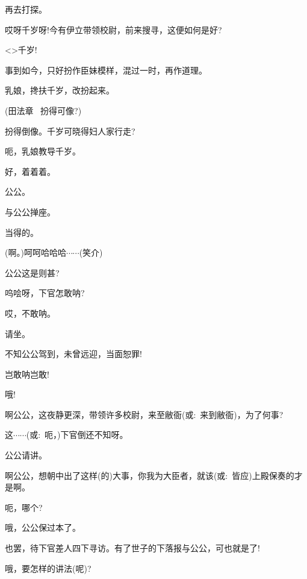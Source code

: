 {再去打探。

哎呀千岁呀!今有伊立带领校尉，前来搜寻，这便如何是好?

\textless{}\!\textgreater{}千岁!

事到如今，只好扮作臣妹模样，混过一时，再作道理。

乳娘，搀扶千岁，改扮起来。





(田法章\hspace{20pt}~ 扮得可像?)

扮得倒像。千岁可晓得妇人家行走?

呃，乳娘教导千岁。

好，着着着。

公公。

与公公掸座。

当得的。

(啊。)呵呵哈哈哈$\cdots{}\cdots{}$({\hwfs 笑介})

公公这是则甚?

呜哙呀，下官怎敢呐?

哎，不敢呐。

请坐。

不知公公驾到，未曾远迎，当面恕罪!

岂敢呐岂敢!

哦!

啊公公，这夜静更深，带领许多校尉，来至敝衙({\akai 或}:~来到敝衙)，为了何事?

这$\cdots{}\cdots{}$({\akai 或}:~呃，)下官倒还不知呀。

公公请讲。

啊公公，想朝中出了这样(的)大事，你我为大臣者，就该({\akai 或}:~皆应)上殿保奏的才是啊。

呃，哪个?

哦，公公保过本了。

也罢，待下官差人四下寻访。有了世子的下落报与公公，可也就是了!

哦，要怎样的讲法(呢)?

}
